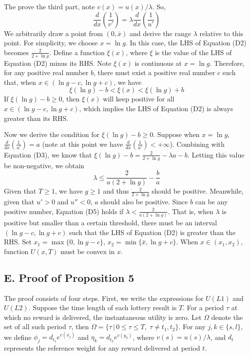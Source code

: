 \documentclass[
  12pt,
]{article}
\begin{document}
The prove the third part, note \(v(x)=u(x)/\lambda\). So, \[
\frac{d}{dx}\left(\frac{1}{v'}\right)=\lambda\frac{d}{dx}\left(\frac{1}{u'}\right)
\]We arbitrarily draw a point from \((0,\bar{x})\) and derive the range
\(\lambda\) relative to this point. For simplicity, we choose
\(x=\ln g\). In this case, the LHS of Equation (D2) becomes
\(\frac{2}{2+\ln g}\). Define a function \(\xi(x)\), where \(\xi\) is
the value of the LHS of Equation (D2) minus its RHS. Note \(\xi(x)\) is
continuous at \(x=\ln g\). Therefore, for any positive real number
\(b\), there must exist a positive real number \(c\) such that, when
\(x\in(\ln g-c,\ln g+c)\), we have\[\tag{D4}
\xi(\ln g)-b<\xi(x)<\xi(\ln g)+b
\]If \(\xi(\ln g)-b\geq 0\), then \(\xi(x)\) will keep positive for all
\(x\in(\ln g-c,\ln g+c)\), which implies the LHS of Equation (D2) is
always greater than its RHS.

Now we derive the condition for \(\xi(\ln g)-b\geq 0\). Suppose when
\(x=\ln g\), \(\frac{d}{dx}\left(\frac{1}{u'}\right)=a\) (note at this
point we have \(\frac{d}{dx}\left(\frac{1}{u'}\right)<+\infty\)).
Combining with Equation (D3), we know that
\(\xi(\ln g)-b =\frac{2}{2+\ln g}-\lambda a-b\). Letting this value be
non-negative, we obtain\[\tag{D5}
\lambda \leq \frac{2}{a(2+\ln g)}-\frac{b}{a}
\]Given that \(T\geq1\), we have \(g\geq 1\) and thus
\(\frac{2}{2+\ln g}\) should be positive. Meanwhile, given that \(u'>0\)
and \(u''<0\), \(a\) should also be positive. Since \(b\) can be any
positive number, Equation (D5) holds if
\(\lambda <\frac{2}{a(2+\ln g)}\). That is, when \(\lambda\) is positive
but smaller than a certain threshold, there must be an interval
\((\ln g-c,\ln g+c)\) such that the LHS of Equation (D2) is greater than
the RHS. Set \(x_1 = \max\{0,\ln g-c\}\),
\(x_2=\min\{\bar{x}, \ln g +c\}\). When \(x\in (x_1,x_2)\), function
\(U(x,T)\) must be convex in \(x\).

\hypertarget{e.-proof-of-proposition-5}{%
\subsection*{E. Proof of Proposition
5}\label{e.-proof-of-proposition-5}}

The proof consists of four steps. First, we write the expressions for
\(U(L1)\) and \(U(L2)\). Suppose the time length of each lottery result
is \(T\). For a period \(\tau\) at which no reward is delivered, the
instantaneous utility is zero. Let \(\Omega\) denote the set of all such
period \(\tau\), then
\(\Omega=\{\tau\,|\,0\leq\tau\leq T,\;\tau \neq t_1,t_2\}\). For any
\(j,k\in\{s,l\}\), we define \(\phi_j=d_{t_1}e^{v(x_j)}\) and
\(\eta_k=d_{t_2}e^{v(y_k)}\), where \(v(s)=u(s)/\lambda\), and \(d_t\)
represents the reference weight for any reward delivered at period
\(t\).
\end{document}
